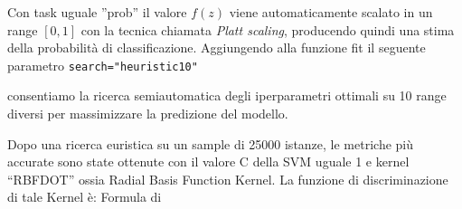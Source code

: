 


Con task uguale ”prob” il valore $f(z)$ viene automaticamente scalato in un range $[0, 1]$ con la tecnica chiamata \textit{Platt scaling}, producendo quindi una stima della probabilità di classificazione.
Aggiungendo alla funzione fit il seguente parametro \texttt{search="heuristic10"}

consentiamo la ricerca semiautomatica degli iperparametri ottimali su 10 range diversi per massimizzare la predizione del modello.

Dopo una ricerca euristica su un sample di 25000 istanze, le metriche più accurate sono state ottenute con il valore C della SVM uguale 1 e kernel “RBFDOT” ossia Radial Basis Function Kernel.
La funzione di discriminazione di tale Kernel è:
Formula di 


